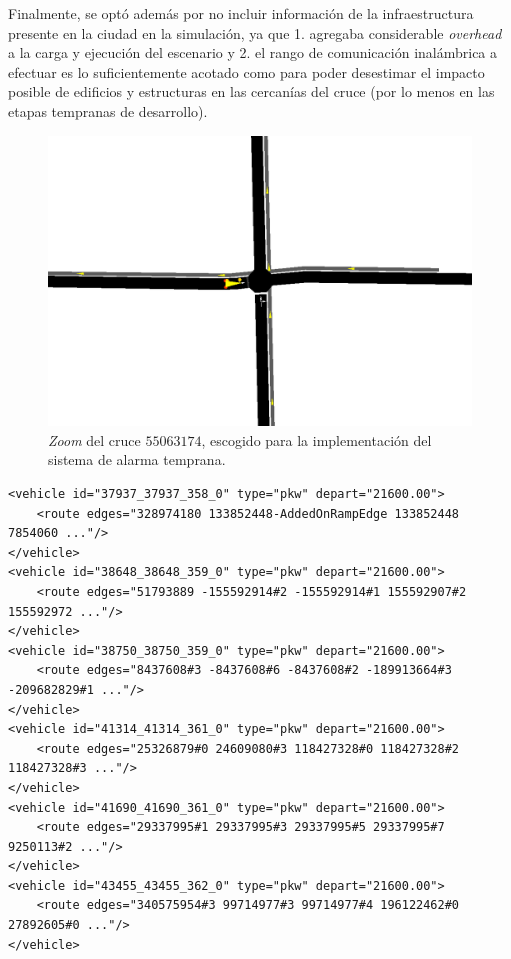\documentclass[11pt,letterpaper]{article}
\begin{document}
Finalmente, se optó además por no incluir información de la infraestructura presente en la ciudad en la simulación, ya que 1. agregaba considerable \emph{overhead} a la carga y ejecución del escenario y 2. el rango de comunicación inalámbrica a efectuar es lo suficientemente acotado como para poder desestimar el impacto posible de edificios y estructuras en las cercanías del cruce (por lo menos en las etapas tempranas de desarrollo).

\begin{figure}
	\centering
	\includegraphics[width=\linewidth]{junction.png}
	\caption[Cruce $55063174$]{\emph{Zoom} del cruce $55063174$, escogido para la implementación del sistema de alarma temprana.}
	\label{sumo:junction}
\end{figure}

\noindent\begin{minipage}{\linewidth}
\begin{lstlisting}[style=m_xml, label={sumo:routes}, caption={Extracto de trazas vehiculares del escenario TAPAS Cologne. Cada vehículo tiene asociada una ruta, la cual describe el camino que recorre este desde su origen hasta su destino.}]
<vehicle id="37937_37937_358_0" type="pkw" depart="21600.00">
    <route edges="328974180 133852448-AddedOnRampEdge 133852448 7854060 ..."/>
</vehicle>
<vehicle id="38648_38648_359_0" type="pkw" depart="21600.00">
    <route edges="51793889 -155592914#2 -155592914#1 155592907#2 155592972 ..."/>
</vehicle>
<vehicle id="38750_38750_359_0" type="pkw" depart="21600.00">
    <route edges="8437608#3 -8437608#6 -8437608#2 -189913664#3 -209682829#1 ..."/>
</vehicle>
<vehicle id="41314_41314_361_0" type="pkw" depart="21600.00">
    <route edges="25326879#0 24609080#3 118427328#0 118427328#2 118427328#3 ..."/>
</vehicle>
<vehicle id="41690_41690_361_0" type="pkw" depart="21600.00">
    <route edges="29337995#1 29337995#3 29337995#5 29337995#7 9250113#2 ..."/>
</vehicle>
<vehicle id="43455_43455_362_0" type="pkw" depart="21600.00">
    <route edges="340575954#3 99714977#3 99714977#4 196122462#0 27892605#0 ..."/>
</vehicle>
\end{lstlisting}
\end{minipage}
\end{document}
